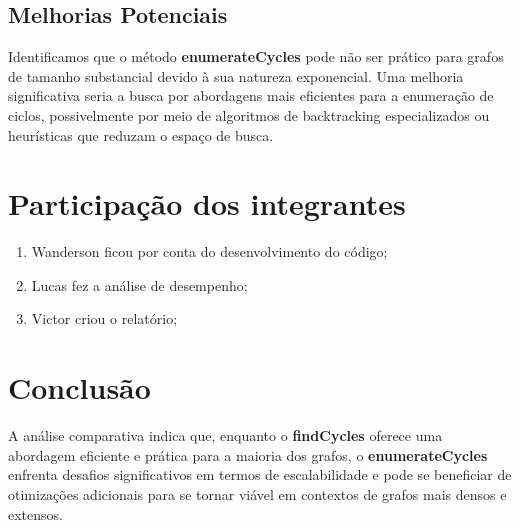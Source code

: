 \documentclass{article}
\begin{document}
\subsection{Melhorias Potenciais}

Identificamos que o método \textbf{enumerateCycles} pode não ser prático para grafos de tamanho substancial devido à sua natureza exponencial. Uma melhoria significativa seria a busca por abordagens mais eficientes para a enumeração de ciclos, possivelmente por meio de algoritmos de backtracking especializados ou heurísticas que reduzam o espaço de busca.

\section{Participação dos integrantes}

\begin{enumerate}
    \item  Wanderson ficou por conta do desenvolvimento do código;
    \item Lucas fez a análise de desempenho;
    \item Victor criou o relatório;

\end{enumerate}

\section{Conclusão}

A análise comparativa indica que, enquanto o \textbf{findCycles} oferece uma abordagem eficiente e prática para a maioria dos grafos, o \textbf{enumerateCycles} enfrenta desafios significativos em termos de escalabilidade e pode se beneficiar de otimizações adicionais para se tornar viável em contextos de grafos mais densos e extensos.
\end{document}
